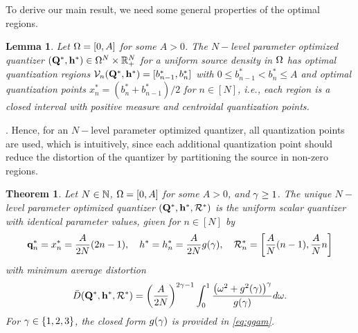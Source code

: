 \documentclass[12pt,onecolumn,journal,draftclsnofoot,letterpaper]{IEEEtran}
\newtheorem{lemma}{Lemma}
\newtheorem{theorem}{Theorem}
\newif\ifarxiv\arxivfalse
\newenvironment{remark}{\par\vspace{1.5ex}\noindent{\em Remark\/}.}{\par\vspace{1.5ex}}
\renewcommand{\vp}{\mathbf q}
\renewcommand{\vP}{\mathbf Q}
\newcommand{\Vor}{\ensuremath{\mathcal{V}}}         %
\newcommand{\Rset}{\ensuremath{\mathcal R}}
\newcommand{\Dis}{\ensuremath{D}}                    %
\newcommand{\AvDis}{\ensuremath{\bar{\Dis}}}         %
\newcommand{\philippstart}{\color{black}}
\begin{document}
\newcommand{\pGlob}{\ensuremath{x^{*}}}
\newcommand{\hGlob}{\ensuremath{h^{*}}}
\newcommand{\qGlob}{\ensuremath{{\mathbf q}^{*}}}
\newcommand{\qLoc}{\ensuremath{{\mathbf q}^{*}}}
%
%
\philippstart
%
%
\color{black}
To derive our main result, we need some general properties of the optimal regions. 
%
\philippstart
%
\begin{lemma}\label{lemma:allActive}
  Let $\Omega=[0,A]$ for some $A>0$. The $N-$level parameter optimized quantizer $(\vP^*,\vh^*)\in\Ome^N\times\R_+^N$ for a
  uniform source density in $\Omega$ has optimal quantization regions $\Vor_n(\vP^*,\vh^*)=[b^*_{n-1},b^*_n]$ with $0\leq
  b^*_{n-1}<b^*_n\leq A$ and optimal quantization points $x_n^*=(b_n^*+b^*_{n-1})/2$ for $n\in[N]$, i.e., each region
  is a closed interval with positive measure and centroidal quantization points.
\end{lemma}
%
\ifarxiv
\begin{proof}
  See \appref{app:proof_lemma_active}.
\end{proof}
\fi
\begin{remark}
  Hence, for an $N-$level parameter optimized quantizer, all quantization points are used, which is intuitively, since
  each additional quantization point should reduce the distortion of the quantizer by partitioning the source in non-zero regions. 
\end{remark}
%
%
\begin{theorem}\label{thm:commonheight}
  Let $N\in{\ensuremath{\mathbb N}}$,  $\Omega=[0,A]$ for some $A>0$, and $\gamma\geq 1$. The \emph{unique $N-$level parameter optimized quantizer} 
  $(\vP^*,\vh^*,\Rset^*)$ is the  uniform scalar quantizer with identical parameter values, given for $n\in[N]$  by   
  \begin{align}
    \vp_n^*=\pGlob_n= \frac{A}{2N} (2n-1),\quad   h^*=h_n^*= \frac{A}{2N} g(\gam),\quad \Rset_n^*=
    \left[\frac{A}{N}(n-1),\frac{A}{N}n\right]
    \label{eq:optimaldeploy} 
  \end{align}
  with minimum average distortion
  \begin{align}
   \AvDis(\vP^*,\vh^*,\Rset^*)=\left(\frac{A}{2N}\right)^{2\gam-1}  \int_0^1 \frac{\big(\ome^2+g^2(\gam)\big)^{\gam}}{g(\gam)}
    d\ome\label{eq:optimumavpow}.
  \end{align}
  For $\gamma\in\{1,2,3\}$, the closed form $g(\gamma)$ is provided in  \eqref{eq:ggam}.
\end{theorem}
%

\ifarxiv
\begin{proof} See \appref{sec:proof_theorem}.
\end{proof}
\fi %
\color{black}
\end{document}
